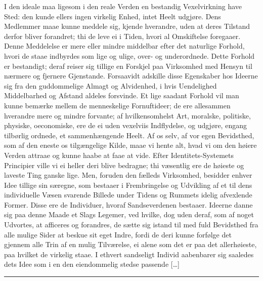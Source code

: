 \documentclass[12pt,a4paper]{article}
\newcommand{\opage}[1]{\marginnote{\footnotesize\textit{[#1]}}}
\begin{document}
\opage{220} \noindent
[\dots] I den ideale maa ligesom i den reale Verden en bestandig Vexelvirkning
have Sted: den kunde ellers ingen virkelig Enhed, intet Heelt udgjøre. Dens
Medlemmer maae kunne meddele sig, kjende hverandre, uden at deres Tilstand derfor
bliver forandret; thi de leve ei i Tiden, hvori al Omskiftelse foregaaer. Denne
Meddelelse er mere eller mindre middelbar efter det naturlige Forhold, hvori de
staae indbyrdes som lige og ulige, over- og underordnede. Dette Forhold er
bestandigt; deraf reiser sig tillige en Forskjel paa Virksomhed med Hensyn til
nærmere og fjernere Gjenstande. Forsaavidt adskille disse Egenskaber hos Ideerne
sig fra den guddommelige Almagt
\opage{221} og Alvidenhed, i hvis Uendelighed Middelbarhed og Afstand aldeles forsvinde. Et
lige saadant Forhold vil man kunne bemærke mellem de menneskelige Fornuftideer; de
ere allesammen hverandre mere og mindre forvante; af hvilkensomhelst Art, moralske,
politiske, physiske, oeconomiske, ere de ei uden vexelviis Indflydelse, og
udgjøre, engang tilbørlig ordnede, et sammenhængende Heelt. Af os selv, af vor egen
Bevidsthed, som af den eneste os tilgængelige Kilde, maae vi hente alt, hvad vi om
den høiere Verden attraae og kunne haabe at faae at vide. Efter
Identitets-Systemets Principier ville vi ei heller deri blive bedragne; thi
væsentlig ere de høieste og laveste Ting ganske lige. Men, foruden den fælleds
Virksomhed, besidder enhver Idee tillige sin særegne, som bestaaer i Frembringelse
og Udvikling af et til dens individuelle Væsen svarende Billede under Tidens og
Rummets idelig afvexlende Former. Disse ere de Individuer, hvoraf Sandseverdenen
bestaaer. Ideerne danne sig paa denne Maade et Slags Legemer, ved hvilke, dog uden
deraf, som af noget Udvortes, at afficeres og forandres, de sætte sig istand til
med fuld Bevidsthed fra alle mulige Sider at beskue sit eget Indre, fordi de deri
kunne forfølge det gjennem alle Trin af en mulig Tilværelse, ei alene som det er
paa det allerhøieste, paa hvilket de virkelig staae. I ethvert sandseligt Individ
aabenbarer sig saaledes dets Idee som i en den eiendommelig stedse passende
[\dots]

\begin{center}\rule{0.25\linewidth}{0.4pt}\end{center}
\end{document}
